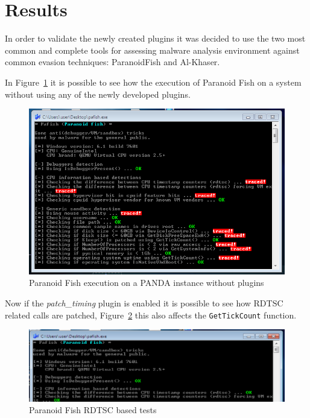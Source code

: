 \section{Results}

In order to validate the newly created plugins it was decided to use the two most common and complete tools for assessing malware analysis environment against common evasion techniques: ParanoidFish and Al-Khaser.

In Figure~\ref{fig:res} it is possible to see how the execution of Paranoid Fish on a system without using any of the newly developed plugins. 

\begin{figure}[htp]
    \centering
    \includegraphics[width=\linewidth]{images/par3.png}%
    \caption{Paranoid Fish execution on a PANDA instance without plugins}%
    \label{fig:res}%
\end{figure}

Now if the \textit{patch\_timing} plugin is enabled it is possible to see how RDTSC related calls are patched, Figure~\ref{fig:patsc} this also affects the \lstinline{GetTickCount} function. 

\begin{figure}[htp]
    \centering
    \includegraphics[width=\linewidth]{images/rdtpa.png}%
    \caption{Paranoid Fish RDTSC based tests}%
    \label{fig:patsc}%
\end{figure}

